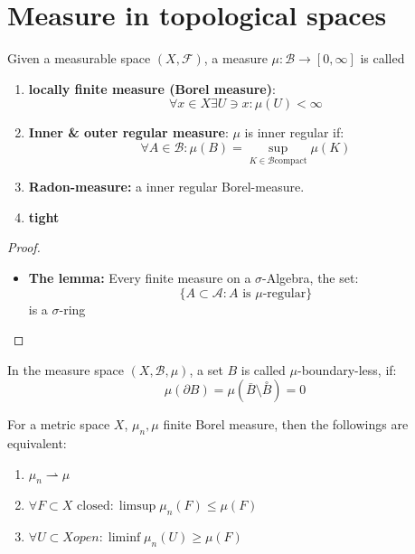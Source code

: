 \section{Measure in topological spaces}
\begin{definition}
	Given a measurable space $(X, \mathcal{F})$, a measure $\mu: \mathcal{B} \rightarrow [0, \infty]$ is called 
	\begin{enumerate}
		\item \textbf{locally finite measure (Borel measure)}: 
			\begin{equation*}
				\forall x \in X \exists U \ni x: \mu(U) < \infty
			\end{equation*}
		\item \textbf{Inner \& outer regular measure}: $\mu$ is inner regular if:
			\begin{equation*}
				\forall A \in \mathcal{B}: \mu(B) = \sup_{K \in \mathcal{B} \text{compact}} \mu(K) 
			\end{equation*}
		\item \textbf{Radon-measure:} a inner regular Borel-measure.
		\item \textbf{tight}
	\end{enumerate}
\end{definition}

\begin{theorem}
\end{theorem}

\begin{proof}
	\begin{itemize}
		\item \textbf{The lemma:} Every finite measure on a $\sigma$-Algebra, the set:
			\begin{equation*}
				\{A \subset \mathcal{A}: A \text{ is  $\mu$-regular}\}
			\end{equation*}
			is a $\sigma$-ring
	\end{itemize}
\end{proof}

\begin{definition}
In the measure space $(X, \mathcal{B}, \mu)$, a set $B$ is called $\mu$-boundary-less, if:
\begin{equation*}
	\mu(\partial B) = \mu(\bar{B} \setminus \overset{\circ}{B}) = 0
\end{equation*}
\end{definition}

\begin{theorem}
	For a metric space $X$, $\mu_n, \mu$ finite Borel measure, then the followings are equivalent:
	\begin{enumerate}
		\item $\mu_n \rightharpoonup \mu$
		\item $\forall F \subset X \text{ closed}: \limsup \mu_n(F) \leq \mu(F)$
		\item $\forall U \subset X open: \liminf \mu_n(U) \geq \mu(F)$
	\end{enumerate}
\end{theorem}
\newpage



